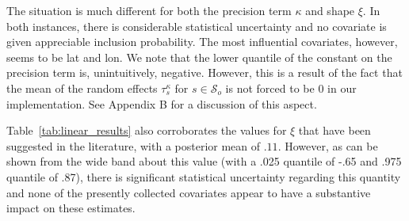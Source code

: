 \documentclass[11pt,english]{article}
\newcommand{\mc}[1]{\mathcal{#1}}
\begin{document}
The situation is much different for both the precision term $\kappa$ and shape $\xi$.  In both instances, there is considerable statistical uncertainty and no covariate is given appreciable inclusion probability. The most influential covariates, however, seems to be lat and lon. We note that the lower quantile of the constant on the precision term is, unintuitively, negative.  However, this is a result of the fact that the mean of the random effects $\tau_s^\kappa$ for $s\in\mc{S}_o$ is not forced to be 0 in our implementation. See Appendix B for a discussion of this aspect.

Table~\ref{tab:linear_results} also corroborates the values for $\xi$ that have been suggested in the literature, with a posterior mean of $.11$.  However, as can be shown from the wide band about this value (with a .025 quantile of -.65 and .975 quantile of .87), there is significant statistical uncertainty regarding this quantity and none of the presently collected covariates appear to have a substantive impact on these estimates. 
\end{document}
